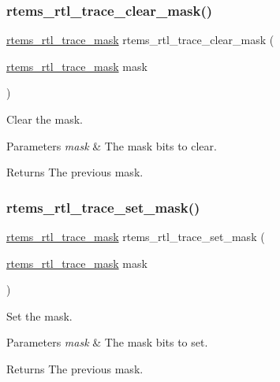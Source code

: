 \subsubsection{\texorpdfstring{rtems\_rtl\_trace\_clear\_mask()}{rtems\_rtl\_trace\_clear\_mask()}}
{\footnotesize\ttfamily \mbox{\hyperlink{rtl-trace_8h_a5cfd053d8ebf1ee26e60b11ce50cc521}{rtems\+\_\+rtl\+\_\+trace\+\_\+mask}} rtems\+\_\+rtl\+\_\+trace\+\_\+clear\+\_\+mask (\begin{DoxyParamCaption}\item[{\mbox{\hyperlink{rtl-trace_8h_a5cfd053d8ebf1ee26e60b11ce50cc521}{rtems\+\_\+rtl\+\_\+trace\+\_\+mask}}}]{mask }\end{DoxyParamCaption})}

Clear the mask.


\begin{DoxyParams}{Parameters}
{\em mask} & The mask bits to clear. \\
\hline
\end{DoxyParams}
\begin{DoxyReturn}{Returns}
The previous mask. 
\end{DoxyReturn}
\mbox{\label{rtl-trace_8h_a7c38294764d873297cfd2089a094169d}} 
\subsubsection{\texorpdfstring{rtems\_rtl\_trace\_set\_mask()}{rtems\_rtl\_trace\_set\_mask()}}
{\footnotesize\ttfamily \mbox{\hyperlink{rtl-trace_8h_a5cfd053d8ebf1ee26e60b11ce50cc521}{rtems\+\_\+rtl\+\_\+trace\+\_\+mask}} rtems\+\_\+rtl\+\_\+trace\+\_\+set\+\_\+mask (\begin{DoxyParamCaption}\item[{\mbox{\hyperlink{rtl-trace_8h_a5cfd053d8ebf1ee26e60b11ce50cc521}{rtems\+\_\+rtl\+\_\+trace\+\_\+mask}}}]{mask }\end{DoxyParamCaption})}

Set the mask.


\begin{DoxyParams}{Parameters}
{\em mask} & The mask bits to set. \\
\hline
\end{DoxyParams}
\begin{DoxyReturn}{Returns}
The previous mask. 
\end{DoxyReturn}
\mbox{\label{rtl-trace_8h_aea463de321ff9a8daf485fa2722e9c38}} 
